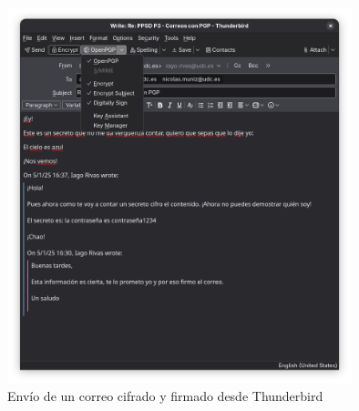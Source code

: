 \begin{figure}[H]
    \includegraphics[width=10cm]{thunderbird-cifrado-firmado.png}
    \caption{Envío de un correo cifrado y firmado desde Thunderbird}
\end{figure}
